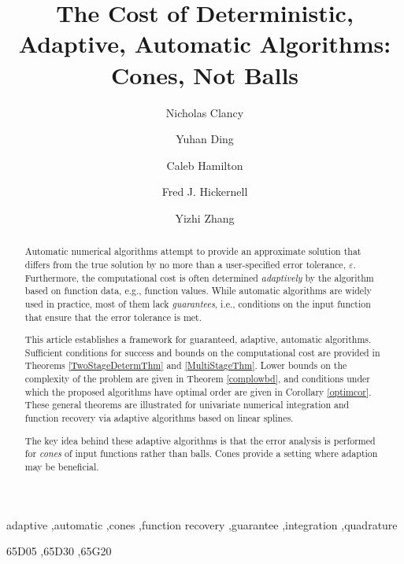 \documentclass[]{elsarticle}
\theoremstyle{definition}
\theoremstyle{remark}
\begin{document}
\begin{frontmatter}

\title{The Cost of Deterministic, Adaptive, Automatic Algorithms:  Cones, Not Balls}
\author{Nicholas Clancy}
\author{Yuhan Ding}
\author{Caleb Hamilton}
\author{Fred J. Hickernell}
\author{Yizhi Zhang}
\address{Room E1-208, Department of Applied Mathematics, Illinois Institute of Technology,\\ 10 W.\ 32$^{\text{nd}}$ St., Chicago, IL 60616}

\begin{abstract} 
Automatic numerical algorithms attempt to provide an approximate solution that differs from the true solution by no more than a user-specified error tolerance, $\varepsilon$. Furthermore, the computational cost is often determined \emph{adaptively} by the algorithm based on function data, e.g., function values. While automatic algorithms are widely used in practice, most of them lack \emph{guarantees}, i.e., conditions on the input function that ensure that the error tolerance is met. 

This article establishes a framework for guaranteed, adaptive, automatic algorithms. Sufficient conditions for success and bounds on the computational cost are provided in Theorems \ref{TwoStageDetermThm} and \ref{MultiStageThm}.  Lower bounds on the complexity of the problem are given in Theorem \ref{complowbd}, and conditions under which the proposed algorithms have optimal order are given in Corollary \ref{optimcor}. These general theorems are illustrated for univariate numerical integration and function recovery via adaptive algorithms based on linear splines.  

The key idea behind these adaptive algorithms is that the error analysis is performed for \emph{cones} of input functions rather than balls.  Cones provide a setting where adaption may be beneficial.
\end{abstract}

\begin{keyword}
adaptive \sep automatic \sep cones \sep function recovery \sep guarantee \sep integration \sep quadrature

\MSC[2010] 65D05 \sep 65D30 \sep 65G20

\end{keyword}
\end{frontmatter}
\end{document}
